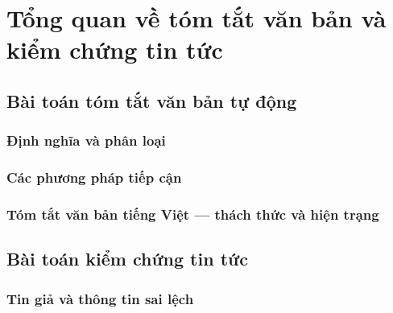 \chapter{Tổng quan về tóm tắt văn bản và kiểm chứng tin tức}

\section{Bài toán tóm tắt văn bản tự động}

\subsection{Định nghĩa và phân loại}

\subsection{Các phương pháp tiếp cận}

\subsection{Tóm tắt văn bản tiếng Việt --- thách thức và hiện trạng}

\section{Bài toán kiểm chứng tin tức}

\subsection{Tin giả và thông tin sai lệch}

